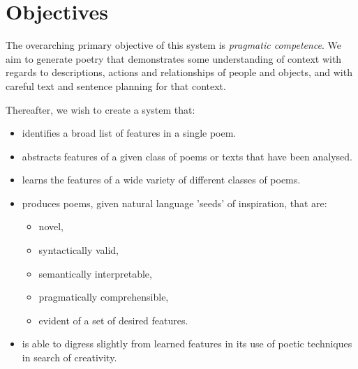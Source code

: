 \section{Objectives}
The overarching primary objective of this system is \textit{pragmatic competence}. We aim to generate poetry that demonstrates some understanding of context with regards to descriptions, actions and relationships of people and objects, and with careful text and sentence planning for that context.

Thereafter, we wish to create a system that:
\begin{itemize}
\item{identifies a broad list of features in a single poem.} 
\item{abstracts features of a given class of poems or texts that have been analysed.}
\item{learns the features of a wide variety of different classes of poems.}
\item{produces poems, given natural language 'seeds' of inspiration, that are:}
	\begin{itemize}
	\setlength{\itemsep}{0pt}
	\item{novel,}
	\item{syntactically valid,}
	\item{semantically interpretable,}
	\item{pragmatically comprehensible,}
	\item{evident of a set of desired features.}
	\end{itemize} 
\item{is able to digress slightly from learned features in its use of poetic techniques in search of creativity.}
\end{itemize}


